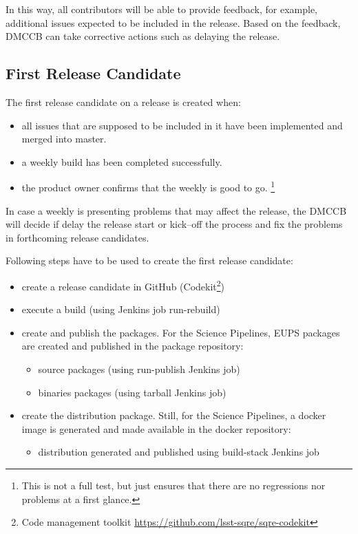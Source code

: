 In this way, all contributors will be able to provide feedback, for example, additional issues expected to be included in the release.
Based on the feedback, DMCCB can take corrective actions such as delaying the release.


\subsection{First Release Candidate} \label{sec:firstrc}

The first release candidate on a release is created when:

\begin{itemize}
\item all issues that are supposed to be included in it have been implemented and merged into master.
\item a weekly build has been completed successfully.
\item the product owner confirms that the weekly is good to go. \footnote{This is not a full test, but just ensures that there are no regressions nor problems at a first glance.}
\end{itemize}

In case a weekly is presenting problems that may affect the release, the DMCCB will decide if delay the release start or kick--off the process and fix the problems in forthcoming release candidates.


Following steps have to be used to create the first release candidate:

\begin{itemize}
\item create a release candidate in GitHub (Codekit\footnote{Code management toolkit \url{https://github.com/lsst-sqre/sqre-codekit}})
\item execute a build (using Jenkins job run-rebuild)
\item create and publish the packages. For the Science Pipelines, EUPS packages are created and published in the package repository:
   \begin{itemize}
   \item source packages (using run-publish Jenkins job)
   \item binaries packages (using tarball Jenkins job)
   \end{itemize}
\item create the distribution package. Still, for the Science Pipelines, a docker image is generated and made available in the docker repository:
   \begin{itemize}
   \item distribution generated and published using build-stack Jenkins job
   \end{itemize}
\end{itemize}


